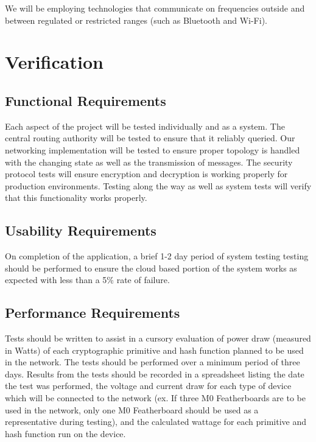 \documentclass[tikz,a4paper,titlepage]{article}
\begin{document}
We will be employing technologies that communicate on frequencies outside and between regulated or restricted ranges (such as Bluetooth and Wi-Fi).


\section{Verification}

\subsection{Functional Requirements}

Each aspect of the project will be tested individually and as a system. The central routing authority will be tested to ensure that it reliably queried. Our networking implementation will be tested to ensure proper topology is handled with the changing state as well as the transmission of messages. The security protocol tests will ensure encryption and decryption is working properly for production environments. Testing along the way as well as system tests will verify that this functionality works properly.



\subsection{Usability Requirements} %

On completion of the application, a brief 1-2 day period of system testing testing should be performed to ensure the cloud based portion of the system works as expected with less than a 5\% rate of failure.

\subsection{Performance Requirements} %

Tests should be written to assist in a cursory evaluation of power draw (measured in Watts) of each cryptographic primitive and hash function planned to be used in the network. The tests should be performed over a minimum period of three days. Results from the tests should be recorded in a spreadsheet listing the date the test was performed, the voltage and current draw for each type of device which will be connected to the network (ex. If three M0 Featherboards are to be used in the network, only one M0 Featherboard should be used as a representative during testing), and the calculated wattage for each primitive and hash function run on the device.
\end{document}
